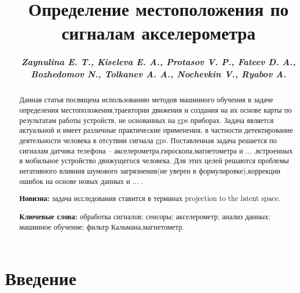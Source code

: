 \documentclass[12pt, a4paper]{article}
\begin{document}
\title{\textbf{Определение местоположения по сигналам акселерометра}}
\author{\bf \em Zaynulina E. T., Kiseleva E. A., Protasov V. P., Fateev D. A.,\\
 \bf \em Bozhedomov N., Tolkanev A. A., Nochevkin V., Ryabov A. }
\date{}
\maketitle


\begin{abstract}
	Данная статья посвящена использованию методов машинного обучения в задаче определения
местоположения,траектории движения и создания на их основе карты по результатам работы устройств, не основанных на gps приборах. Задача является актуальной и имеет различные практические применения, в частности детектирование деятельности человека в отсутвии сигнала gps. Поставленная задача решается по сигналам датчика телефона – акселерометра,гироскопа,магнетометра и ... ,встроенных в мобильное устройство движущегося человека. Для этих целей решаются проблемы негативного влияния шумового загрязнения(не уверен в формулировке),коррекции ошибок на основе новых данных и ... .

{\bf Новизна:} задача исследования ставится в терминах projection to the latent space.

{\bf Ключевые слова:}  обработка сигналов; сенсоры; акселерометр; анализ данных; машинное обучение; фильтр Кальмана,магнетометр.
\end{abstract}



\setcounter{secnumdepth}{0}
\section{Введение}



\begin{thebibliography}{4}
\end{thebibliography}
\end{document}
